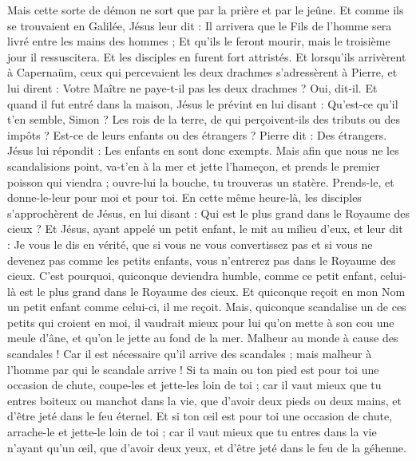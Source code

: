\begin{multicols}{2}
Mais cette sorte de démon ne sort que par la prière et par le jeûne.
Et comme ils se trouvaient en Galilée, Jésus leur dit : Il arrivera que le Fils de l'homme sera livré entre les mains des hommes ;
Et qu'ils le feront mourir, mais le troisième jour il ressuscitera. Et les disciples en furent fort attristés.
Et lorsqu'ils arrivèrent à Capernaüm, ceux qui percevaient les deux drachmes s'adressèrent à Pierre, et lui dirent : Votre Maître ne paye-t-il pas les deux drachmes ?
Oui, dit-il. Et quand il fut entré dans la maison, Jésus le prévint en lui disant : Qu'est-ce qu'il t'en semble, Simon ? Les rois de la terre, de qui perçoivent-ils des tributs ou des impôts ? Est-ce de leurs enfants ou des étrangers ?
Pierre dit : Des étrangers. Jésus lui répondit : Les enfants en sont donc exempts.
Mais afin que nous ne les scandalisions point, va-t'en à la mer et jette l'hameçon, et prends le premier poisson qui viendra ; ouvre-lui la bouche, tu trouveras un statère. Prends-le, et donne-le-leur pour moi et pour toi.
\VerseOne{}En cette même heure-là, les disciples s'approchèrent de Jésus, en lui disant : Qui est le plus grand dans le Royaume des cieux ?
Et Jésus, ayant appelé un petit enfant, le mit au milieu d'eux,
et leur dit : Je vous le dis en vérité, que si vous ne vous convertissez pas et si vous ne devenez pas comme les petits enfants, vous n'entrerez pas dans le Royaume des cieux.
C'est pourquoi, quiconque deviendra humble, comme ce petit enfant, celui-là est le plus grand dans le Royaume des cieux.
Et quiconque reçoit en mon Nom un petit enfant comme celui-ci, il me reçoit.
Mais, quiconque scandalise un de ces petits qui croient en moi, il vaudrait mieux pour lui qu'on mette à son cou une meule d'âne, et qu'on le jette au fond de la mer.
Malheur au monde à cause des scandales ! Car il est nécessaire qu'il arrive des scandales ; mais malheur à l'homme par qui le scandale arrive !
Si ta main ou ton pied est pour toi une occasion de chute, coupe-les et jette-les loin de toi ; car il vaut mieux que tu entres boiteux ou manchot dans la vie, que d'avoir deux pieds ou deux mains, et d'être jeté dans le feu éternel.
Et si ton œil est pour toi une occasion de chute, arrache-le et jette-le loin de toi ; car il vaut mieux que tu entres dans la vie n'ayant qu'un œil, que d'avoir deux yeux, et d'être jeté dans le feu de la géhenne.

\end{multicols}
